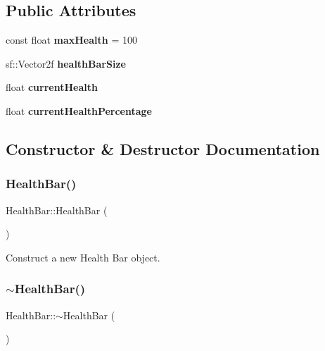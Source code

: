 \subsection*{Public Attributes}
\begin{DoxyCompactItemize}
\item 
\mbox{\label{classHealthBar_a2a55f0591eb2afb398ef7f512fde2c82}} 
const float {\bfseries max\+Health} = 100
\item 
\mbox{\label{classHealthBar_a23f47ac8e49fe7abbe30560f3acf5013}} 
sf\+::\+Vector2f {\bfseries health\+Bar\+Size}
\item 
\mbox{\label{classHealthBar_aa7ececd74ac938c7244d15bff93e0d67}} 
float {\bfseries current\+Health}
\item 
\mbox{\label{classHealthBar_a4876beef8e90e9a8aecb37002077342d}} 
float {\bfseries current\+Health\+Percentage}
\end{DoxyCompactItemize}


\subsection{Constructor \& Destructor Documentation}
\mbox{\label{classHealthBar_a05f694deecdc0399d9c5fb230493df05}} 
\subsubsection{\texorpdfstring{HealthBar()}{HealthBar()}}
{\footnotesize\ttfamily Health\+Bar\+::\+Health\+Bar (\begin{DoxyParamCaption}{ }\end{DoxyParamCaption})}



Construct a new Health Bar object. 

\mbox{\label{classHealthBar_a4a67801ba7a3b2e82e61d0cd02247771}} 
\subsubsection{\texorpdfstring{$\sim$HealthBar()}{~HealthBar()}}
{\footnotesize\ttfamily Health\+Bar\+::$\sim$\+Health\+Bar (\begin{DoxyParamCaption}{ }\end{DoxyParamCaption})}



